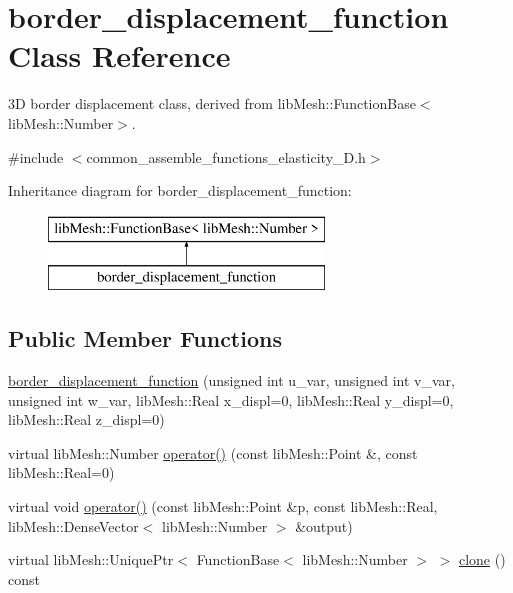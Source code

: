 \hypertarget{classborder__displacement__function}{}\section{border\+\_\+displacement\+\_\+function Class Reference}
\label{classborder__displacement__function}


3\+D border displacement class, derived from lib\+Mesh\+::\+Function\+Base$<$lib\+Mesh\+::\+Number$>$.  




{\ttfamily \#include $<$common\+\_\+assemble\+\_\+functions\+\_\+elasticity\+\_\+D.\+h$>$}

Inheritance diagram for border\+\_\+displacement\+\_\+function\+:\begin{figure}[H]
\begin{center}
\leavevmode
\includegraphics[height=2.000000cm]{classborder__displacement__function}
\end{center}
\end{figure}
\subsection*{Public Member Functions}
\begin{DoxyCompactItemize}
\item 
\hyperlink{classborder__displacement__function_a96fa6052b759f3348654178cab730362}{border\+\_\+displacement\+\_\+function} (unsigned int u\+\_\+var, unsigned int v\+\_\+var, unsigned int w\+\_\+var, lib\+Mesh\+::\+Real x\+\_\+displ=0, lib\+Mesh\+::\+Real y\+\_\+displ=0, lib\+Mesh\+::\+Real z\+\_\+displ=0)
\item 
virtual lib\+Mesh\+::\+Number \hyperlink{classborder__displacement__function_a36164904aab66a842edd7f43cb6b391c}{operator()} (const lib\+Mesh\+::\+Point \&, const lib\+Mesh\+::\+Real=0)
\item 
virtual void \hyperlink{classborder__displacement__function_a286bf7b4ca0e09e3804e2b90730454db}{operator()} (const lib\+Mesh\+::\+Point \&p, const lib\+Mesh\+::\+Real, lib\+Mesh\+::\+Dense\+Vector$<$ lib\+Mesh\+::\+Number $>$ \&output)
\item 
virtual lib\+Mesh\+::\+Unique\+Ptr$<$ Function\+Base$<$ lib\+Mesh\+::\+Number $>$ $>$ \hyperlink{classborder__displacement__function_ae04386c0af6b4722d226c034351d8b5e}{clone} () const 
\end{DoxyCompactItemize}


